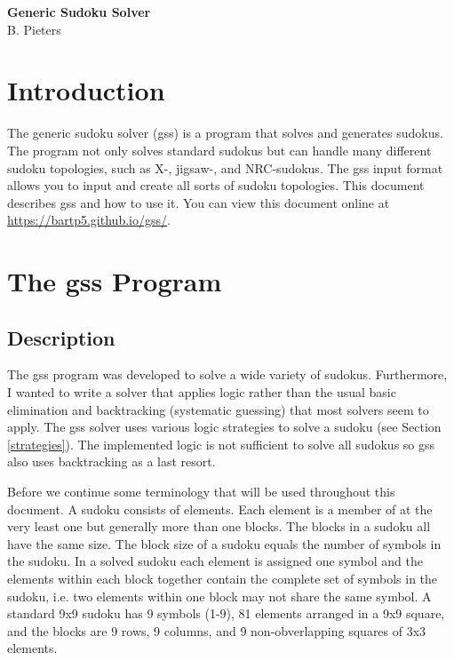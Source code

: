\documentclass[12pt]{article}
\begin{document}
\begin{titlepage}
\begin{center}
\vspace*{5cm} 
{\Huge\textbf{Generic Sudoku Solver}}\\
\vspace{4cm}
B. Pieters 
\end{center}
\end{titlepage}

\tableofcontents
\pagebreak
\section{Introduction}
The generic sudoku solver (gss) is a program that solves and generates sudokus. The program not only solves standard sudokus but can handle many different sudoku topologies, such as X-, jigsaw-, and NRC-sudokus. The gss input format allows you to input and create all sorts of sudoku topologies. This document describes gss and how to use it. You can view this document online at \url{https://bartp5.github.io/gss/}.

\section{The gss Program}
\subsection{Description}
The gss program was developed to solve a wide variety of sudokus. Furthermore, I wanted to write a solver that applies logic rather than the usual basic elimination and backtracking (systematic guessing) that most solvers seem to apply. The gss solver uses various logic strategies to solve a sudoku (see Section \ref{strategies}). The implemented logic is not sufficient to solve all sudokus so gss also uses backtracking as a last resort.

Before we continue some terminology that will be used throughout this document. A sudoku consists of elements. Each element is a member of at the very least one but generally more than one blocks. The blocks in a sudoku all have the same size. The block size of a sudoku equals the number of symbols in the sudoku. In a solved sudoku each element is assigned one symbol and the elements within each block together contain the complete set of symbols in the sudoku, i.e. two elements within one block may not share the same symbol. A standard 9x9 sudoku has 9 symbols (1-9), 81 elements arranged in a 9x9 square, and the blocks are 9 rows, 9 columns, and 9 non-obverlapping squares of 3x3 elements.
\end{document}
